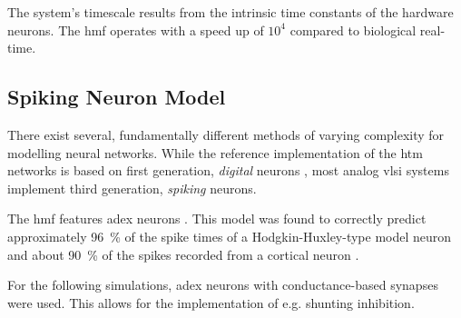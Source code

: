The system's timescale results from the intrinsic time constants of the hardware neurons. The \gls{hmf} operates with a speed up of $10^4$ compared to biological real-time.

\subsection{Spiking Neuron Model}

There exist several, fundamentally different methods of varying complexity for modelling neural networks. While the reference implementation of the \gls{htm} networks is based on first generation, \emph{digital} neurons \citep{nupic}, most analog \gls{vlsi} systems implement third generation, \emph{spiking} neurons.

The \gls{hmf} features \gls{adex} neurons \citep{brette2005adaptive}. This model was found to correctly predict approximately \SI{96}{\%} of the spike times of a Hodgkin-Huxley-type model neuron and about \SI{90}{\%} of the spikes recorded from a cortical neuron \citep{jolivet2008quantitative}.

For the following simulations, \gls{adex} neurons with conductance-based synapses were used. This allows for the implementation of e.g. shunting inhibition.

